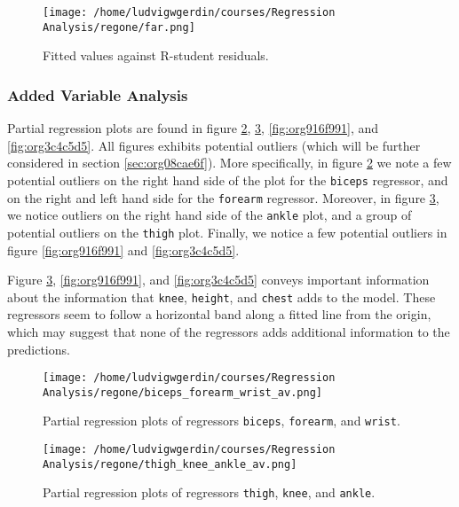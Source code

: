 \documentclass[11pt]{article}
\begin{document}
\begin{figure}[htbp]
\centering
\texttt{[image: /home/ludvigwgerdin/courses/Regression Analysis/regone/far.png]}
\caption{\label{fig:org3d2c550}
Fitted values against R-student residuals.}
\end{figure}

\subsubsection{Added Variable Analysis}
\label{sec:org81fcfc3}

Partial regression plots are found in figure \ref{fig:orgfc00962}, \ref{fig:orgff4a85f},
\ref{fig:org916f991}, and \ref{fig:org3c4c5d5}. All figures exhibits potential outliers 
(which will be further considered in section \ref{sec:org08cae6f}).
More specifically, in figure \ref{fig:orgfc00962} we note a 
few potential outliers on the right hand side of the plot for the \texttt{biceps} regressor, and on the
right and left hand side for the \texttt{forearm} regressor. Moreover, in figure \ref{fig:orgff4a85f}, we 
notice outliers on the right hand side of the \texttt{ankle} plot, and a group of potential outliers on the
\texttt{thigh} plot. Finally, we notice a few potential outliers in figure \ref{fig:org916f991} and 
\ref{fig:org3c4c5d5}.

Figure \ref{fig:orgff4a85f}, \ref{fig:org916f991}, and \ref{fig:org3c4c5d5} 
conveys important information about the information that \texttt{knee}, \texttt{height}, and
\texttt{chest} adds to the model. These regressors seem to follow a horizontal band along a fitted 
line from the origin, which may suggest that none of the regressors adds additional information 
to the predictions.

\begin{figure}[htbp]
\centering
\texttt{[image: /home/ludvigwgerdin/courses/Regression Analysis/regone/biceps\_forearm\_wrist\_av.png]}
\caption{\label{fig:orgfc00962}
Partial regression plots of regressors \texttt{biceps}, \texttt{forearm}, and \texttt{wrist}.}
\end{figure}   

\begin{figure}[htbp]
\centering
\texttt{[image: /home/ludvigwgerdin/courses/Regression Analysis/regone/thigh\_knee\_ankle\_av.png]}
\caption{\label{fig:orgff4a85f}
Partial regression plots of regressors \texttt{thigh}, \texttt{knee}, and \texttt{ankle}.}
\end{figure}
\end{document}
